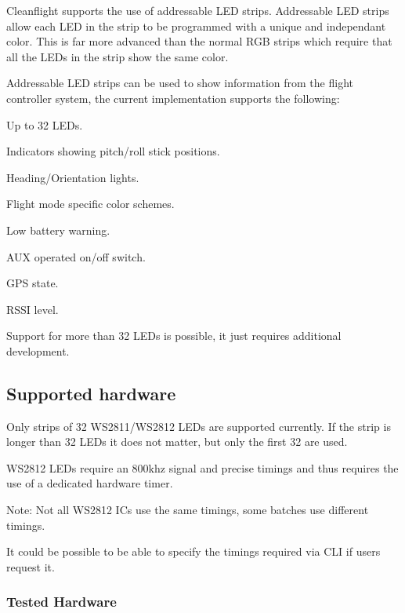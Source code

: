 Cleanflight supports the use of addressable L\+E\+D strips. Addressable L\+E\+D strips allow each L\+E\+D in the strip to be programmed with a unique and independant color. This is far more advanced than the normal R\+G\+B strips which require that all the L\+E\+Ds in the strip show the same color.

Addressable L\+E\+D strips can be used to show information from the flight controller system, the current implementation supports the following\+:


\begin{DoxyItemize}
\item Up to 32 L\+E\+Ds.
\item Indicators showing pitch/roll stick positions.
\item Heading/\+Orientation lights.
\item Flight mode specific color schemes.
\item Low battery warning.
\item A\+U\+X operated on/off switch.
\item G\+P\+S state.
\item R\+S\+S\+I level.
\end{DoxyItemize}

Support for more than 32 L\+E\+Ds is possible, it just requires additional development.

\subsection*{Supported hardware}

Only strips of 32 W\+S2811/\+W\+S2812 L\+E\+Ds are supported currently. If the strip is longer than 32 L\+E\+Ds it does not matter, but only the first 32 are used.

W\+S2812 L\+E\+Ds require an 800khz signal and precise timings and thus requires the use of a dedicated hardware timer.

Note\+: Not all W\+S2812 I\+Cs use the same timings, some batches use different timings.

It could be possible to be able to specify the timings required via C\+L\+I if users request it.

\subsubsection*{Tested Hardware}


